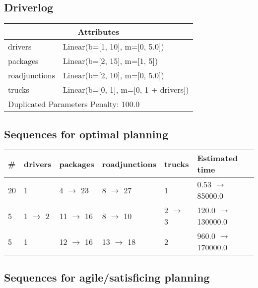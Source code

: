 \documentclass{article}
\begin{document}
                            \newpage \subsection{Driverlog}
                    \begin{center}
                    \begin{tabular}{@{}p{}p{}@{}}
                    \multicolumn{2}{c}{\bf \large Attributes}\\\midrule
                    drivers & Linear(b=[1, 10], m=[0, 5.0])\\
packages & Linear(b=[2, 15], m=[1, 5])\\
roadjunctions & Linear(b=[2, 10], m=[0, 5.0])\\
trucks & Linear(b=[0, 1], m=[0, 1 + drivers]) \\\midrule
                    \multicolumn{2}{l}{Duplicated Parameters Penalty: 100.0}
                    \end{tabular}
                    \end{center}
                
                            \subsection*{Sequences for optimal planning}

                            \begin{center}
                            \begin{tabular}{@{}l|l|l|l|l|l@{}}
                            \# & drivers & packages & roadjunctions & trucks & Estimated time\\\midrule
                            20&1&4 $\rightarrow$ 23&8 $\rightarrow$ 27&1&0.53 $\rightarrow$ 85000.0\\
5&1 $\rightarrow$ 2&11 $\rightarrow$ 16&8 $\rightarrow$ 10&2 $\rightarrow$ 3&120.0 $\rightarrow$ 130000.0\\
5&1&12 $\rightarrow$ 16&13 $\rightarrow$ 18&2&960.0 $\rightarrow$ 170000.0
                            \end{tabular}
                            \end{center}
                    
                         \subsection*{Sequences for agile/satisficing planning}
\end{document}
